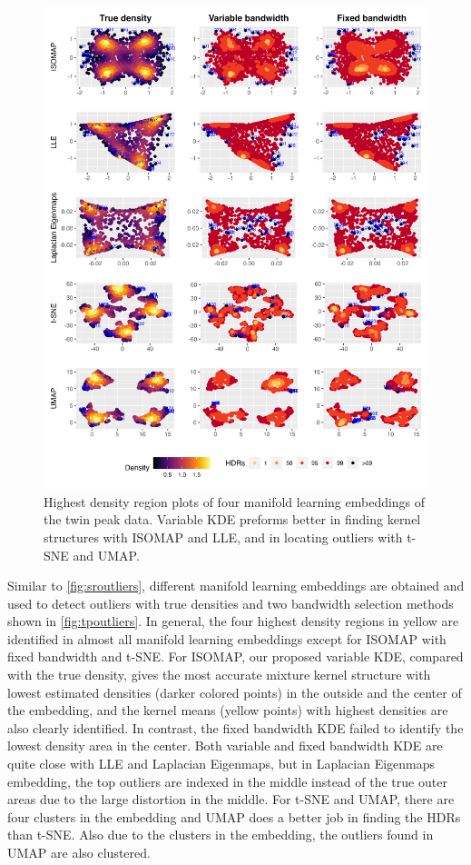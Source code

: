 \documentclass[11pt,a4paper,]{article}
\begin{document}
\begin{figure}

{\centering \includegraphics[width=0.95\linewidth]{figures/Twin Peak5levels_outliers_comparison_4ml_3cases_riem0_1} 

}

\caption{Highest density region plots of four manifold learning embeddings of the twin peak data. Variable KDE preforms better in finding kernel structures with ISOMAP and LLE, and in locating outliers with t-SNE and UMAP.}\label{fig:tpoutliers}
\end{figure}

Similar to \autoref{fig:sroutliers}, different manifold learning embeddings are obtained and used to detect outliers with true densities and two bandwidth selection methods shown in \autoref{fig:tpoutliers}.
In general, the four highest density regions in yellow are identified in almost all manifold learning embeddings except for ISOMAP with fixed bandwidth and t-SNE. For ISOMAP, our proposed variable KDE, compared with the true density, gives the most accurate mixture kernel structure with lowest estimated densities (darker colored points) in the outside and the center of the embedding, and the kernel means (yellow points) with highest densities are also clearly identified. In contrast, the fixed bandwidth KDE failed to identify the lowest density area in the center. Both variable and fixed bandwidth KDE are quite close with LLE and Laplacian Eigenmaps, but in Laplacian Eigenmaps embedding, the top outliers are indexed in the middle instead of the true outer areas due to the large distortion in the middle. For t-SNE and UMAP, there are four clusters in the embedding and UMAP does a better job in finding the HDRs than t-SNE. Also due to the clusters in the embedding, the outliers found in UMAP are also clustered.
\end{document}
